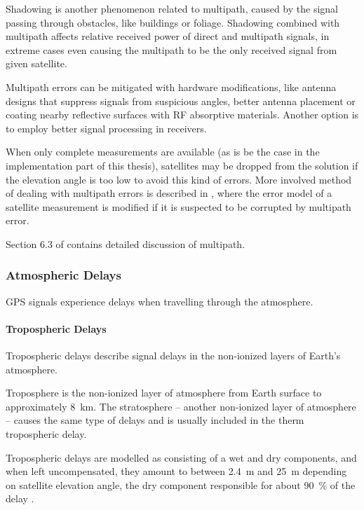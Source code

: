 Shadowing is another phenomenon related to multipath, caused by the signal passing through obstacles, like buildings or foliage.
Shadowing combined with multipath affects relative received power of direct and multipath signals, in extreme cases
even causing the multipath to be the only received signal from given satellite.

Multipath errors can be mitigated with hardware modifications, like antenna designs that suppress signals from suspicious angles,
better antenna placement or coating nearby reflective surfaces with RF absorptive materials.
Another option is to employ better signal processing in receivers.

When only complete measurements are available (as is be the case in the implementation part of this thesis),
satellites may be dropped from the solution if the elevation angle
is too low to avoid this kind of errors.
More involved method of dealing with multipath errors is described in \cite{viandier08},
where the error model of a satellite measurement is modified if it is suspected to be corrupted
by multipath error.

Section 6.3 of \cite{kaplan06} contains detailed discussion of multipath.

\subsubsection{Atmospheric Delays}

GPS signals experience delays when travelling through the atmosphere.

\paragraph{Tropospheric Delays}
Tropospheric delays describe signal delays in the non-ionized layers of Earth's atmosphere.

Troposphere is the non-ionized layer of atmosphere from Earth surface to
approximately \SI{8}{\kilo\meter}.
The stratosphere -- another non-ionized layer of atmosphere -- causes the same
type of delays and is usually included in the therm tropospheric delay.

Tropospheric delays are modelled as consisting of a wet and dry components,
and when left uncompensated, they amount to between \SI{2.4}{\meter} and \SI{25}{\meter}
depending on satellite elevation angle, the dry component
responsible for about \SI{90}{\percent} of the delay \cite{kaplan06}.

